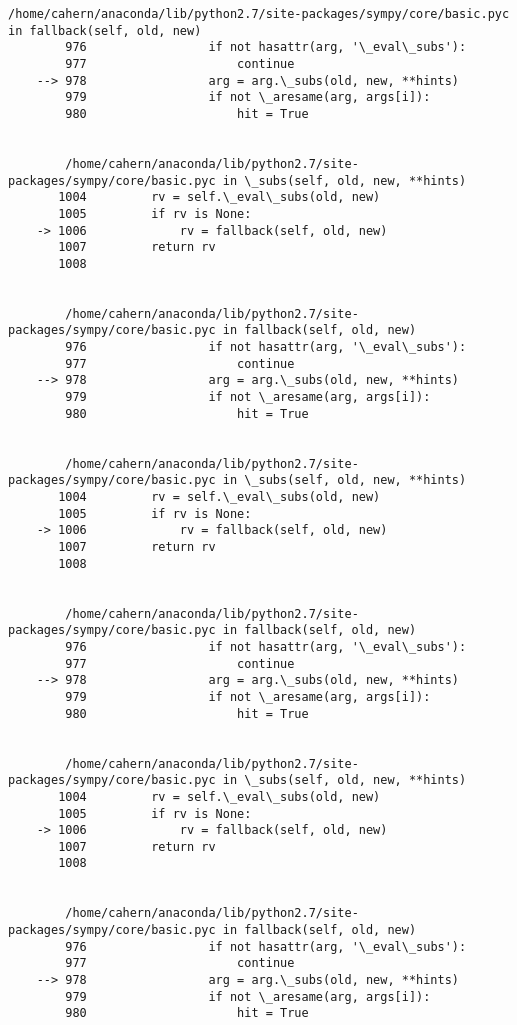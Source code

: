\begin{Verbatim}[commandchars=\\\{\}]
        /home/cahern/anaconda/lib/python2.7/site-packages/sympy/core/basic.pyc in fallback(self, old, new)
        976                 if not hasattr(arg, '\_eval\_subs'):
        977                     continue
    --> 978                 arg = arg.\_subs(old, new, **hints)
        979                 if not \_aresame(arg, args[i]):
        980                     hit = True


        /home/cahern/anaconda/lib/python2.7/site-packages/sympy/core/basic.pyc in \_subs(self, old, new, **hints)
       1004         rv = self.\_eval\_subs(old, new)
       1005         if rv is None:
    -> 1006             rv = fallback(self, old, new)
       1007         return rv
       1008 


        /home/cahern/anaconda/lib/python2.7/site-packages/sympy/core/basic.pyc in fallback(self, old, new)
        976                 if not hasattr(arg, '\_eval\_subs'):
        977                     continue
    --> 978                 arg = arg.\_subs(old, new, **hints)
        979                 if not \_aresame(arg, args[i]):
        980                     hit = True


        /home/cahern/anaconda/lib/python2.7/site-packages/sympy/core/basic.pyc in \_subs(self, old, new, **hints)
       1004         rv = self.\_eval\_subs(old, new)
       1005         if rv is None:
    -> 1006             rv = fallback(self, old, new)
       1007         return rv
       1008 


        /home/cahern/anaconda/lib/python2.7/site-packages/sympy/core/basic.pyc in fallback(self, old, new)
        976                 if not hasattr(arg, '\_eval\_subs'):
        977                     continue
    --> 978                 arg = arg.\_subs(old, new, **hints)
        979                 if not \_aresame(arg, args[i]):
        980                     hit = True


        /home/cahern/anaconda/lib/python2.7/site-packages/sympy/core/basic.pyc in \_subs(self, old, new, **hints)
       1004         rv = self.\_eval\_subs(old, new)
       1005         if rv is None:
    -> 1006             rv = fallback(self, old, new)
       1007         return rv
       1008 


        /home/cahern/anaconda/lib/python2.7/site-packages/sympy/core/basic.pyc in fallback(self, old, new)
        976                 if not hasattr(arg, '\_eval\_subs'):
        977                     continue
    --> 978                 arg = arg.\_subs(old, new, **hints)
        979                 if not \_aresame(arg, args[i]):
        980                     hit = True



\end{Verbatim}
